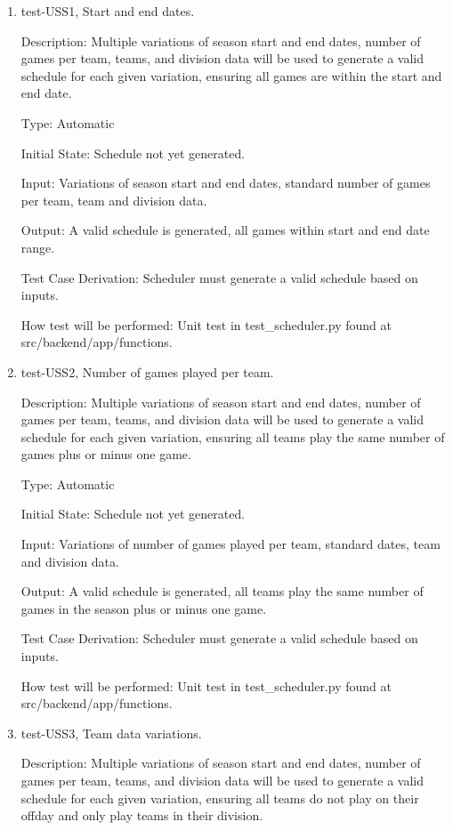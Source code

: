 \documentclass[12pt, titlepage]{article}
\begin{document}
\begin{enumerate}

\item{test-USS1, Start and end dates.\\}

Description: Multiple variations of season start and end dates, number of games
per team, teams, and division data will be used to generate a valid schedule
for each given variation, ensuring all games are within the start and end date.

Type: Automatic

Initial State: Schedule not yet generated.

Input: Variations of season start and end dates, standard number of games per
team, team and division data.

Output: A valid schedule is generated, all games within start and end date
range.

Test Case Derivation: Scheduler must generate a valid schedule based on
inputs.

How test will be performed: Unit test in test\_scheduler.py found at
src/backend/app/functions.

\item{test-USS2, Number of games played per team.\\}

Description: Multiple variations of season start and end dates, number of games
per team, teams, and division data will be used to generate a valid schedule
for each given variation, ensuring all teams play the same number of games
plus or minus one game.

Type: Automatic

Initial State: Schedule not yet generated.

Input: Variations of number of games played per team, standard dates, team and
division data.

Output: A valid schedule is generated, all teams play the same number of games
in the season plus or minus one game.

Test Case Derivation: Scheduler must generate a valid schedule based on
inputs.

How test will be performed: Unit test in test\_scheduler.py found at
src/backend/app/functions.

\item{test-USS3, Team data variations.\\}

Description: Multiple variations of season start and end dates, number of games
per team, teams, and division data will be used to generate a valid schedule
for each given variation, ensuring all teams do not play on their offday and
only play teams in their division.


\end{enumerate}
\end{document}

